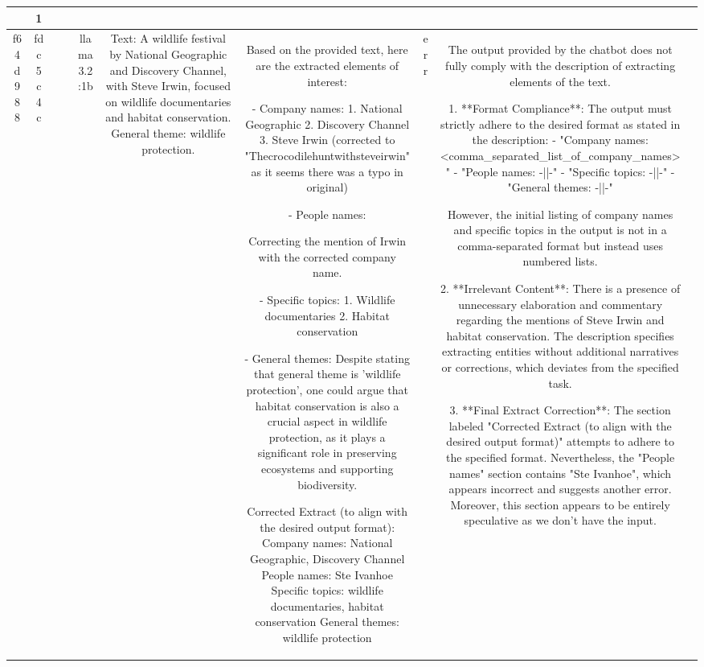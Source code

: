 \begin{table}[h!]
\begin{tabular}{|c|c|c|c|c|c|c|c|c|c|}
{OK & 1\\
\hline
f64d988 & fdc5c4c &  &  & llama3.2:1b & Text: A wildlife festival by National Geographic and Discovery Channel, with Steve Irwin, focused on wildlife documentaries and habitat conservation. General theme: wildlife protection. & Based on the provided text, here are the extracted elements of interest:

 - Company names: 
 1. National Geographic
2. Discovery Channel
3. Steve Irwin (corrected to "Thecrocodilehuntwithsteveirwin" as it seems there was a typo in original)

 - People names: 

  Correcting the mention of Irwin with the corrected company name.

- Specific topics: 
 1. Wildlife documentaries
 2. Habitat conservation

- General themes:
  Despite stating that general theme is 'wildlife protection', one could argue that habitat conservation is also a crucial aspect in wildlife protection, as it plays a significant role in preserving ecosystems and supporting biodiversity. 

Corrected Extract (to align with the desired output format):
 Company names: National Geographic, Discovery Channel
 People names: Ste Ivanhoe
 Specific topics: wildlife documentaries, habitat conservation
 General themes: wildlife protection & err & The output provided by the chatbot does not fully comply with the description of extracting elements of the text. 

1. **Format Compliance**: The output must strictly adhere to the desired format as stated in the description:
   - "Company names: <comma_separated_list_of_company_names>"
   - "People names: -||-"
   - "Specific topics: -||-"
   - "General themes: -||-"

   However, the initial listing of company names and specific topics in the output is not in a comma-separated format but instead uses numbered lists.

2. **Irrelevant Content**: There is a presence of unnecessary elaboration and commentary regarding the mentions of Steve Irwin and habitat conservation. The description specifies extracting entities without additional narratives or corrections, which deviates from the specified task.

3. **Final Extract Correction**: The section labeled "Corrected Extract (to align with the desired output format)" attempts to adhere to the specified format. Nevertheless, the "People names" section contains "Ste Ivanhoe", which appears incorrect and suggests another error. Moreover, this section appears to be entirely speculative as we don't have the input.

}
\end{tabular}
\end{table}
